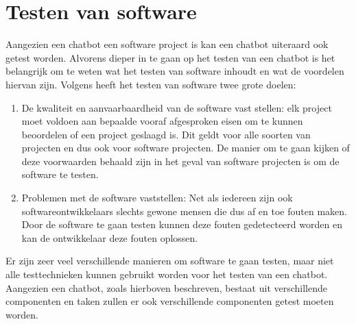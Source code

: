 \section{Testen van software}

Aangezien een chatbot een software project is kan een chatbot uiteraard ook getest worden. Alvorens dieper in te gaan op het testen van een chatbot is het belangrijk om te weten wat het testen van software inhoudt en wat de voordelen hiervan zijn. Volgens \textcite{Jorgensen2018} heeft het testen van software twee grote doelen:

\begin{enumerate}
    \item De kwaliteit en aanvaarbaardheid van de software vast stellen: 
    elk project moet voldoen aan bepaalde vooraf afgesproken eisen om te kunnen beoordelen of een project geslaagd is. Dit geldt voor alle soorten van projecten en dus ook voor software projecten. De manier om te gaan kijken of deze voorwaarden behaald zijn in het geval van software projecten is om de software te testen.
    \item Problemen met de software vaststellen:
    Net als iedereen zijn ook softwareontwikkelaars slechts gewone mensen die dus af en toe fouten maken. Door de software te gaan testen kunnen deze fouten gedetecteerd worden en kan de ontwikkelaar deze fouten oplossen.
\end{enumerate}

Er zijn zeer veel verschillende manieren om software te gaan testen, maar niet alle testtechnieken kunnen gebruikt worden voor het testen van een chatbot. Aangezien een chatbot, zoals hierboven beschreven, bestaat uit verschillende componenten en taken zullen er ook verschillende componenten getest moeten worden. 

